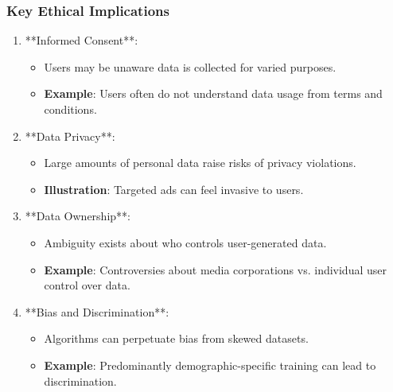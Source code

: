 \documentclass{beamer}
\begin{document}
\begin{frame}[fragile]
    \frametitle{Key Ethical Implications}
    \begin{enumerate}
        \item **Informed Consent**:
            \begin{itemize}
                \item Users may be unaware data is collected for varied purposes.
                \item \textbf{Example}: Users often do not understand data usage from terms and conditions.
            \end{itemize}
        \item **Data Privacy**:
            \begin{itemize}
                \item Large amounts of personal data raise risks of privacy violations.
                \item \textbf{Illustration}: Targeted ads can feel invasive to users.
            \end{itemize}
        \item **Data Ownership**:
            \begin{itemize}
                \item Ambiguity exists about who controls user-generated data.
                \item \textbf{Example}: Controversies about media corporations vs. individual user control over data.
            \end{itemize}
        \item **Bias and Discrimination**:
            \begin{itemize}
                \item Algorithms can perpetuate bias from skewed datasets.
                \item \textbf{Example}: Predominantly demographic-specific training can lead to discrimination.
            \end{itemize}
    \end{enumerate}
\end{frame}
\end{document}
